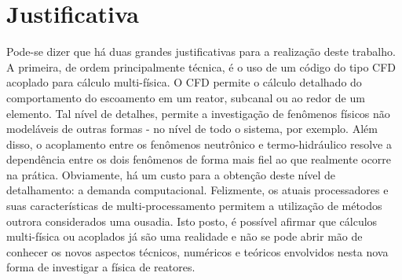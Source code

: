 %

\section{Justificativa}

Pode-se dizer que há duas grandes justificativas para a realização deste trabalho. A primeira, de ordem principalmente
técnica, é o uso de um código do tipo CFD acoplado para cálculo multi-física. O CFD permite o cálculo detalhado do
comportamento do escoamento em um reator, subcanal ou ao redor de um elemento. Tal nível de detalhes, permite a
investigação de fenômenos físicos não modeláveis de outras formas - no nível de todo o sistema, por exemplo. Além disso,
o acoplamento entre os fenômenos neutrônico e termo-hidráulico resolve a dependência entre os dois fenômenos de forma
mais fiel ao que realmente ocorre na prática. Obviamente, há um custo para a obtenção deste nível de detalhamento: a
demanda computacional. Felizmente, os atuais processadores e suas características de multi-processamento permitem
a utilização de métodos outrora considerados uma ousadia. Isto posto, é possível afirmar que cálculos multi-física ou
acoplados já são uma realidade e não se pode abrir mão de conhecer os novos aspectos técnicos, numéricos e teóricos
envolvidos nesta nova forma de investigar a física de reatores.

